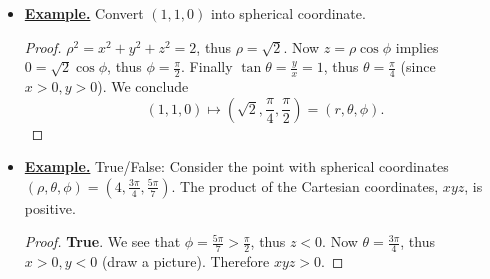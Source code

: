\begin{itemize}
    \item \underline{\textbf{Example.}} Convert $(1,1,0)$ into spherical coordinate.
    \begin{proof} $\rho^2 = x^2+y^2+z^2 = 2$, thus $\rho = \sqrt{2}$. Now $z = \rho \cos \phi$ implies $0 = \sqrt{2} \cos \phi$, thus $\phi = \frac{\pi}{2}$. Finally $\tan\theta = \frac{y}{x} = 1$, thus $\theta = \frac{\pi}{4}$ (since $x>0, y>0$). We conclude 
    \begin{equation*}
        (1,1,0) \mapsto \left(\sqrt{2}, \frac{\pi}{4}, \frac{\pi}{2}\right) = (r,\theta, \phi).
    \end{equation*}
    \end{proof}

    \item \underline{\textbf{Example.}}  True/False: Consider the point with spherical coordinates $(\rho, \theta,\phi)=(4, \frac{3\pi}{4}, \frac{5\pi}{7})$. The product of the Cartesian coordinates, $xyz$, is positive.
    \begin{proof} \textbf{True}. We see that $\phi = \frac{5\pi}{7} > \frac{\pi}{2}$, thus $z<0$. Now $\theta = \frac{3\pi}{4}$, thus $x>0, y<0$ (draw a picture). Therefore $xyz>0$.
    \end{proof}
\end{itemize}
